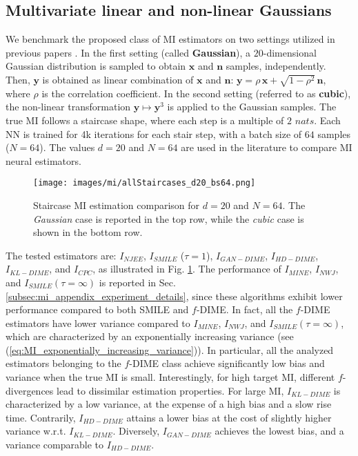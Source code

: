 \subsection{Multivariate linear and non-linear Gaussians}
\label{subsec:mi_stairs}
We benchmark the proposed class of MI estimators on two settings utilized in previous papers \cite{Poole2019, Song2020}.
In the first setting (called \textbf{Gaussian}), a $20$-dimensional Gaussian distribution is sampled to obtain $\mathbf{x}$ and $\mathbf{n}$ samples, independently. Then, $\mathbf{y}$ is obtained as linear combination of $\mathbf{x}$ and $\mathbf{n}$: $\mathbf{y} = \rho \, \mathbf{x} + \sqrt{1-\rho^2} \, \mathbf{n}$, where $\rho$ is the correlation coefficient.
In the second setting (referred to as \textbf{cubic}), the non-linear transformation $\mathbf{y} \mapsto \mathbf{y}^3$ is applied to the Gaussian samples. The true MI follows a staircase shape, where each step is a multiple of $2$ $nats$. Each NN is trained for 4k iterations for each stair step, with a batch size of $64$ samples ($N=64$). The values $d=20$ and $N=64$ are used in the literature to compare MI neural estimators. 
\begin{figure}
	\centering
	\texttt{[image: images/mi/allStaircases\_d20\_bs64.png]}
	\caption{Staircase MI estimation comparison for $d=20$ and $N=64$. The \textit{Gaussian} case is reported in the top row, while the \textit{cubic} case is shown in the bottom row.}
	\label{fig:MI_stairs}
\end{figure} 
The tested estimators are: $I_{NJEE}$, $I_{SMILE}$ ($\tau=1$), $I_{GAN-DIME}$, $I_{HD-DIME}$, $I_{KL-DIME}$, and $I_{CPC}$, as illustrated in Fig. \ref{fig:MI_stairs}. The performance of $I_{MINE}$, $I_{NWJ}$, and $I_{SMILE} (\tau=\infty)$ is reported in Sec. \ref{subsec:mi_appendix_experiment_details}, since these algorithms exhibit lower performance compared to both SMILE and $f$-DIME.
In fact, all the $f$-DIME estimators have lower variance compared to $I_{MINE}$, $I_{NWJ}$, and $I_{SMILE} (\tau = \infty)$, which are characterized by an exponentially increasing variance (see (\ref{eq:MI_exponentially_increasing_variance})).
In particular, all the analyzed estimators belonging to the $f$-DIME class achieve significantly low bias and variance when the true MI is small. Interestingly, for high target MI, different $f$-divergences lead to dissimilar estimation properties.
For large MI, $I_{KL-DIME}$ is characterized by a low variance, at the expense of a high bias and a slow rise time.
Contrarily, $I_{HD-DIME}$ attains a lower bias at the cost of slightly higher variance w.r.t. $I_{KL-DIME}$. 
Diversely, $I_{GAN-DIME}$ achieves the lowest bias, and a variance comparable to $I_{HD-DIME}$.

